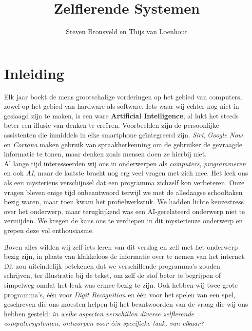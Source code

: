 \documentclass[a4paper,titlepage]{article}
\title{Zelflerende Systemen}
\author{Steven Bronsveld en Thijs van Loenhout}
\begin{document}
\begin{titlepage}

\maketitle
\end{titlepage}

\renewcommand{\contentsname}{Inhoud}

\newpage
\tableofcontents



\newpage
\section{Inleiding}
Elk jaar boekt de mens grootschalige vorderingen op het gebied van computers, zowel op het gebied van hardware als software. Iets waar wij echter nog niet in geslaagd zijn te maken, is een ware \textbf{Artificial Intelligence}, al lukt het steeds beter een illusie van denken te cre\"eren. Voorbeelden zijn de persoonlijke assistenten die inmiddels in elke smartphone ge\"integreerd zijn. \textit{Siri}, \textit{Google Now} en \textit{Cortana} maken gebruik van spraakherkenning om de gebruiker de gevraagde informatie te tonen, maar denken zoals mensen doen ze hierbij niet. \\

Al lange tijd interesseerden wij ons in onderwerpen als \textit{computers}, \textit{programmeren} en ook \textit{AI}, maar de laatste bracht nog erg veel vragen met zich mee. Het leek ons als een mysterieus verschijnsel dat een programma zichzelf kon verbeteren. Onze vragen bleven enige tijd onbeantwoord terwijl we met de alledaagse schooltaken bezig waren, maar toen kwam het profielwerkstuk. We hadden lichte keuzestress over het onderwerp, maar terugkijkend was een AI-gerelateerd onderwerp niet te vermijden. We kregen de kans ons te verdiepen in dit mysterieuze onderwerp en grepen deze vol enthousiasme.

Boven alles wilden wij zelf iets leren van dit verslag en zelf met het onderwerp bezig zijn, in plaats van klakkeloos de informatie over te nemen van het internet. Dit zou uiteindelijk betekenen dat we verschillende programma's zouden schrijven, ter illustratie bij de tekst, om zelf de stof beter te begrijpen of simpelweg omdat het leuk was ermee bezig te zijn. Ook hebben wij twee grote programma's, \'e\'en voor \textit{Digit Recognition} en \'e\'en voor het spelen van een spel, geschreven die ons moesten helpen bij het beantwoorden van de vraag die wij ons hebben gesteld: \textit{in welke aspecten verschillen diverse zelflerende computersystemen, ontworpen voor \'e\'en specifieke taak, van elkaar?}
\end{document}
